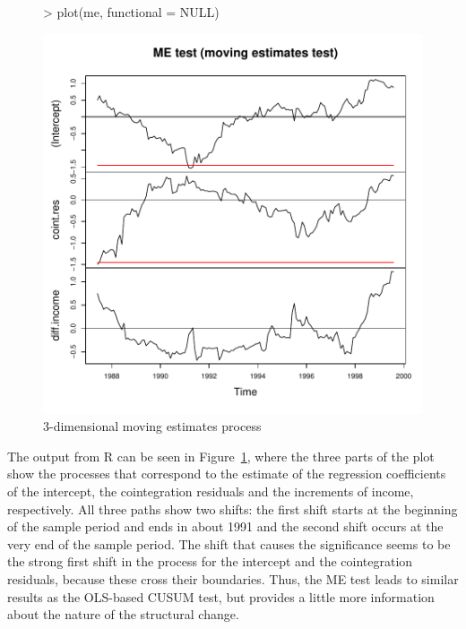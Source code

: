 \documentclass[10pt,a4paper]{article}
\begin{document}
\begin{figure}[h]
\begin{center}
\begin{Schunk}
\begin{Sinput}
> plot(me, functional = NULL)
\end{Sinput}
\end{Schunk}
\includegraphics{strucchange-intro-ME-null}
\caption{\label{fig:me-null} 3-dimensional moving estimates process}
\end{center}
\end{figure}

The output from \textsf{R} can be seen in Figure~\ref{fig:me-null}, where the
three parts of the plot
show the processes that correspond to the estimate of the
regression coefficients of the intercept, the cointegration residuals and the
increments of income, respectively. All three paths show two shifts: the first
shift starts at the beginning of the sample period and ends in about 1991 and
the second shift occurs at the very end of the sample period. The shift that
causes the significance seems to be the strong first shift in the process for
the intercept and the cointegration residuals, because these cross their
boundaries. Thus, the ME test leads to similar results as the
OLS-based CUSUM test, but provides a little more information about the nature of
the structural change.
\end{document}
